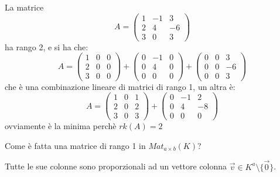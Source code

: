\documentclass[../main.tex]{subfiles}
\begin{document}
\begin{example}
    La matrice
    \begin{equation*}
        A = \begin{pmatrix}
            1 & -1 & 3  \\
            2 & 4  & -6 \\
            3 & 0  & 3
        \end{pmatrix}
    \end{equation*}
    ha rango 2, e si ha che:
    \begin{equation*}
        A = \begin{pmatrix}
            1 & 0 & 0 \\
            2 & 0 & 0 \\
            3 & 0 & 0
        \end{pmatrix} + \begin{pmatrix}
            0 & -1 & 0 \\
            0 & 4  & 0 \\
            0 & 0  & 0
        \end{pmatrix} + \begin{pmatrix}
            0 & 0 & 3  \\
            0 & 0 & -6 \\
            0 & 0 & 3
        \end{pmatrix}
    \end{equation*}
    che è una combinazione lineare di matrici di rango 1, un altra è:
    \begin{equation*}
        A = \begin{pmatrix}
            1 & 0 & 1 \\
            2 & 0 & 2 \\
            3 & 0 & 3
        \end{pmatrix} + \begin{pmatrix}
            0 & -1 & 2  \\
            0 & 4  & -8 \\
            0 & 0  & 0
        \end{pmatrix}
    \end{equation*}
    ovviamente è la minima perchè $rk(A) = 2$
\end{example}

Come è fatta una matrice di rango 1 in $Mat_{a \times b}(K)$?

Tutte le sue colonne sono proporzionali ad un vettore colonna $\overrightarrow{v} \in K^a \setminus \{\overrightarrow{0}\}$.
\end{document}
